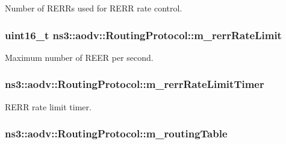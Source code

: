 Number of R\+E\+R\+Rs used for R\+E\+RR rate control. 

\subsubsection[{\texorpdfstring{m\+\_\+rerr\+Rate\+Limit}{m_rerrRateLimit}}]{\setlength{\rightskip}{0pt plus 5cm}uint16\+\_\+t ns3\+::aodv\+::\+Routing\+Protocol\+::m\+\_\+rerr\+Rate\+Limit\hspace{0.3cm}{\ttfamily [private]}}\hypertarget{classns3_1_1aodv_1_1RoutingProtocol_ad7a69761e61bcea41a2bc87ad8928e2d}{}\label{classns3_1_1aodv_1_1RoutingProtocol_ad7a69761e61bcea41a2bc87ad8928e2d}


Maximum number of R\+E\+ER per second. 

\subsubsection[{\texorpdfstring{m\+\_\+rerr\+Rate\+Limit\+Timer}{m_rerrRateLimitTimer}}]{ ns3\+::aodv\+::\+Routing\+Protocol\+::m\+\_\+rerr\+Rate\+Limit\+Timer\hspace{0.3cm}{\ttfamily [private]}}\hypertarget{classns3_1_1aodv_1_1RoutingProtocol_a0eaa679b6dea15e92c550591eabbccc1}{}\label{classns3_1_1aodv_1_1RoutingProtocol_a0eaa679b6dea15e92c550591eabbccc1}


R\+E\+RR rate limit timer. 

\subsubsection[{\texorpdfstring{m\+\_\+routing\+Table}{m_routingTable}}]{ ns3\+::aodv\+::\+Routing\+Protocol\+::m\+\_\+routing\+Table\hspace{0.3cm}{\ttfamily [private]}}\hypertarget{classns3_1_1aodv_1_1RoutingProtocol_a4e1003a34c8adc96db71096d88c98ae0}{}\label{classns3_1_1aodv_1_1RoutingProtocol_a4e1003a34c8adc96db71096d88c98ae0}


